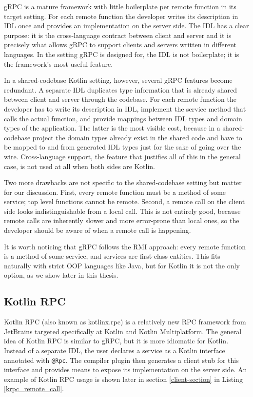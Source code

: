 \documentclass[a4paper,11pt,oneside]{article}
\newcommand{\kotlini}[1]{\texttt{#1}}
\begin{document}
gRPC is a mature framework with little boilerplate per remote function in its target setting. For
each remote function the developer writes its description in IDL once and provides an implementation on
the server side. The IDL has a clear purpose: it is the cross-language contract between client and
server and it is precisely what allows gRPC to support clients and servers written in different
languages. In the setting gRPC is designed for, the IDL is not boilerplate; it is the framework's most
useful feature.

In a shared-codebase Kotlin setting, however, several gRPC features become redundant. A separate IDL
duplicates type information that is already shared between client and server through the codebase.
For each remote function the developer has to write its description in IDL, implement the service method
that calls the actual function, and provide mappings between IDL types and domain types of the
application. The latter is the most visible cost, because in a shared-codebase project the domain types
already exist in the shared code and have to be mapped to and from generated IDL types just for the
sake of going over the wire. Cross-language support, the feature that justifies all of this in the
general case, is not used at all when both sides are Kotlin.

Two more drawbacks are not specific to the shared-codebase setting but matter for our discussion.
First, every remote function must be a method of some service; top level functions cannot be
remote. Second, a remote call on the client side looks indistinguishable from a local call. This is
not entirely good, because remote calls are inherently slower and more error-prone than local
ones, so the developer should be aware of when a remote call is happening.

It is worth noticing that gRPC follows the RMI approach: every remote function is a method of some
service, and services are first-class entities. This fits naturally with strict OOP languages like
Java, but for Kotlin it is not the only option, as we show later in this thesis.

\subsection{Kotlin RPC}

Kotlin RPC (also known as kotlinx.rpc) \cite{noauthor_kotlinkotlinxrpc_nodate} is a relatively new
RPC framework from JetBrains targeted specifically at Kotlin and Kotlin Multiplatform. The general
idea of Kotlin RPC is similar to gRPC, but it is more idiomatic for Kotlin. Instead of a separate IDL,
the user declares a service as a Kotlin interface annotated with \kotlini{@Rpc}. The compiler plugin then
generates a client stub for this interface and provides means to expose its implementation on the
server side. An example of Kotlin RPC usage is shown later in section \ref{client-section}
in Listing \ref{krpc_remote_call}.
\end{document}
